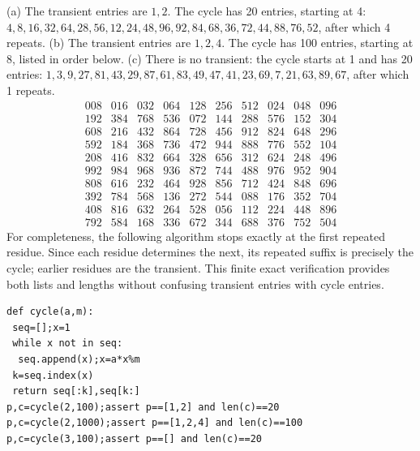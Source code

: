 (a) The transient entries are $1,2$. The cycle has 20 entries, starting at 4: $4,8,16,32,64,28,56,12,24,48,96,92,84,68,36,72,44,88,76,52$, after which 4 repeats. (b) The transient entries are $1,2,4$. The cycle has 100 entries, starting at 8, listed in order below. (c) There is no transient: the cycle starts at 1 and has 20 entries: $1,3,9,27,81,43,29,87,61,83,49,47,41,23,69,7,21,63,89,67$, after which 1 repeats.
\[\begin{array}{rrrrrrrrrr}008&016&032&064&128&256&512&024&048&096\\
192&384&768&536&072&144&288&576&152&304\\
608&216&432&864&728&456&912&824&648&296\\
592&184&368&736&472&944&888&776&552&104\\
208&416&832&664&328&656&312&624&248&496\\
992&984&968&936&872&744&488&976&952&904\\
808&616&232&464&928&856&712&424&848&696\\
392&784&568&136&272&544&088&176&352&704\\
408&816&632&264&528&056&112&224&448&896\\
792&584&168&336&672&344&688&376&752&504\end{array}\]
For completeness, the following algorithm stops exactly at the first repeated residue. Since each residue determines the next, its repeated suffix is precisely the cycle; earlier residues are the transient. This finite exact verification provides both lists and lengths without confusing transient entries with cycle entries.
\begin{verbatim}
def cycle(a,m):
 seq=[];x=1
 while x not in seq:
  seq.append(x);x=a*x%m
 k=seq.index(x)
 return seq[:k],seq[k:]
p,c=cycle(2,100);assert p==[1,2] and len(c)==20
p,c=cycle(2,1000);assert p==[1,2,4] and len(c)==100
p,c=cycle(3,100);assert p==[] and len(c)==20
\end{verbatim}
